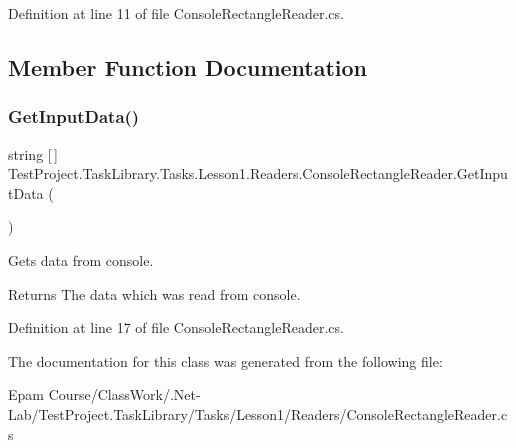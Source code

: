 Definition at line 11 of file Console\+Rectangle\+Reader.\+cs.



\subsection{Member Function Documentation}
\mbox{\label{class_test_project_1_1_task_library_1_1_tasks_1_1_lesson1_1_1_readers_1_1_console_rectangle_reader_ae952d087dc237938d093fdf82d9af4b3}} 
\subsubsection{\texorpdfstring{GetInputData()}{GetInputData()}}
{\footnotesize\ttfamily string \mbox{[}$\,$\mbox{]} Test\+Project.\+Task\+Library.\+Tasks.\+Lesson1.\+Readers.\+Console\+Rectangle\+Reader.\+Get\+Input\+Data (\begin{DoxyParamCaption}{ }\end{DoxyParamCaption})}



Gets data from console. 

\begin{DoxyReturn}{Returns}
The data which was read from console.
\end{DoxyReturn}


Definition at line 17 of file Console\+Rectangle\+Reader.\+cs.



The documentation for this class was generated from the following file\+:\begin{DoxyCompactItemize}
\item 
Epam Course/\+Class\+Work/.\+Net-\/\+Lab/\+Test\+Project.\+Task\+Library/\+Tasks/\+Lesson1/\+Readers/Console\+Rectangle\+Reader.\+cs\end{DoxyCompactItemize}
